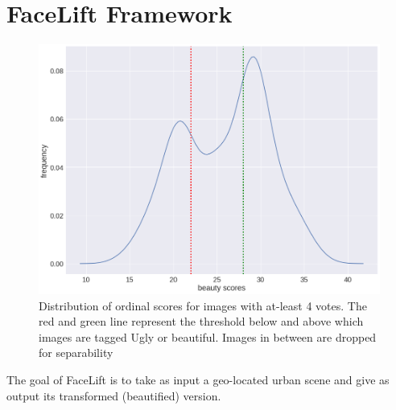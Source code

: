 \section{FaceLift Framework}
\label{sec:framework}

\begin{figure}[t!]
	\centering
	\includegraphics[width=0.7\columnwidth]{Plot/Trueskill.png}
	\caption{Distribution of ordinal scores for images with at-least 4 votes. The red and green line represent the threshold below and above which images are tagged Ugly or beautiful. Images in between are dropped for separability }
	\label{fig:Trueskill}
\end{figure}

The goal of FaceLift is to take as input a geo-located urban scene and give as output its transformed (beautified) version. 


